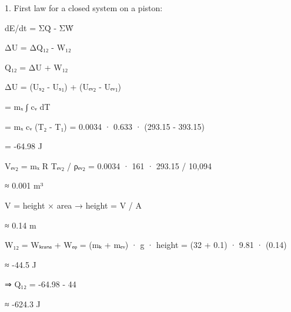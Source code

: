 1. First law for a closed system on a piston:  

dE/dt = ΣQ̇ - ΣẆ  

ΔU = ΔQ₁₂ - W₁₂  

Q₁₂ = ΔU + W₁₂  

ΔU = (Uₛ₂ - Uₛ₁) + (Uₑᵥ₂ - Uₑᵥ₁)  

= mₓ ∫ cᵥ dT  

= mₓ cᵥ (T₂ - T₁) = 0.0034 · 0.633 · (293.15 - 393.15)  

= -64.98 J  

Vₑᵥ₂ = mₓ R Tₑᵥ₂ / ρₑᵥ₂ = 0.0034 · 161 · 293.15 / 10,094  

≈ 0.001 m³  

V = height × area → height = V / A  

≈ 0.14 m  

W₁₂ = Wₖᵣₐₙₐ + Wₑᵩ = (mₖ + mₑᵥ) · g · height = (32 + 0.1) · 9.81 · (0.14)  

≈ -44.5 J  

⇒ Q₁₂ = -64.98 - 44  

≈ -624.3 J